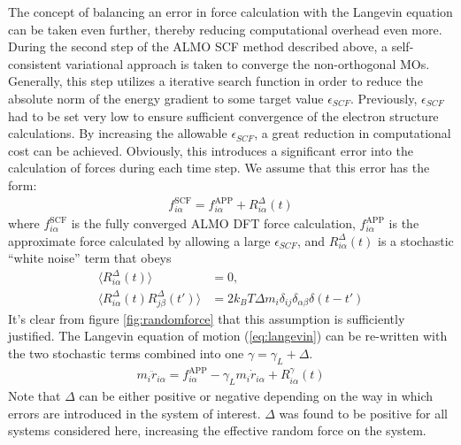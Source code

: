 \documentclass[10pt,aps,prl,twocolumn,amsmath,amssymb,superscriptaddress,longbibliography]{revtex4-1}
\begin{document}
The concept of balancing an error in force calculation with the Langevin equation can be taken even further, thereby reducing computational overhead even more. 
During the second step of the ALMO SCF method described above, a self-consistent variational approach is taken to converge the non-orthogonal MOs. 
Generally, this step utilizes a iterative search function in order to reduce the absolute norm of the energy gradient to some target value $\epsilon_{SCF}$. 
Previously, $\epsilon_{SCF}$ had to be set very low to ensure sufficient convergence of the electron structure calculations. 
By increasing the allowable $\epsilon_{SCF}$, a great reduction in computational cost can be achieved. 
Obviously, this introduces a significant error into the calculation of forces during each time step. 
We assume that this error has the form:
%
\begin{align}
\label{eq:assumption}
f^{\text{SCF}}_{i\alpha} = f^{\text{APP}}_{i\alpha} + R^{\Delta}_{i\alpha} (t)
\end{align}
%
where $f^{\text{SCF}}_{i\alpha}$ is the fully converged ALMO DFT force calculation, $f^{\text{APP}}_{i\alpha}$ is the approximate force calculated by allowing a large $\epsilon_{SCF}$, and $R^{\Delta}_{i\alpha} (t)$ is a stochastic ``white noise'' term that obeys
%
\begin{align}
\label{eq:stochastic2}
\langle R^{\Delta}_{i\alpha} (t) \rangle &= 0, \\
\label{eq:stochastic3}
\langle R^{\Delta}_{i\alpha} (t)  R^{\Delta}_{j\beta} (t') \rangle &= 2 k_B T \Delta m_i \delta_{ij} \delta_{\alpha\beta} \delta(t-t')
\end{align}
%
It's clear from figure \ref{fig:randomforce} that this assumption is sufficiently justified. 
The Langevin equation of motion (\ref{eq:langevin}) can be re-written with the two stochastic terms combined into one $\gamma = \gamma_L+\Delta$.
%
\begin{align}
\label{eq:langevin2}
m_i \ddot{r}_{i\alpha} = f^{\text{APP}}_{i\alpha} - \gamma_L m_i \dot{r}_{i\alpha} + R^{\gamma}_{i\alpha} (t)
\end{align}
%
Note that $\Delta$ can be either positive or negative depending on the way in which errors are introduced in the system of interest. 
$\Delta$ was found to be positive for all systems considered here, increasing the effective random force on the system.

\end{document}
